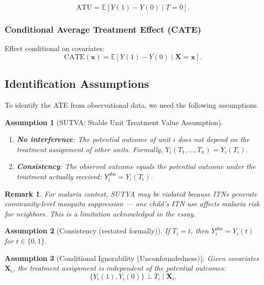 \documentclass[12pt]{article}
\numberwithin{equation}{section}
\newtheorem{assumption}{Assumption}[section]
\newtheorem{remark}{Remark}[section]
\begin{document}
	\[
	\text{ATU} = \mathbb{E}[Y(1) - Y(0) \mid T = 0].
	\]
	
	\subsubsection{Conditional Average Treatment Effect (CATE)}
	
	Effect conditional on covariates:
	\[
	\text{CATE}(\mathbf{x}) = \mathbb{E}[Y(1) - Y(0) \mid \mathbf{X} = \mathbf{x}].
	\]
	
	\subsection{Identification Assumptions}
	
	To identify the ATE from observational data, we need the following assumptions.
	
	\begin{assumption}[SUTVA: Stable Unit Treatment Value Assumption]
		\begin{enumerate}
			\item \textbf{No interference}: The potential outcome of unit $i$ does not depend on the treatment assignment of other units. Formally, $Y_i(T_1, \dots, T_n) = Y_i(T_i)$.
			\item \textbf{Consistency}: The observed outcome equals the potential outcome under the treatment actually received: $Y_i^{\text{obs}} = Y_i(T_i)$.
		\end{enumerate}
	\end{assumption}
	
	\begin{remark}
		For malaria context, SUTVA may be violated because ITNs generate community-level mosquito suppression — one child's ITN use affects malaria risk for neighbors. This is a limitation acknowledged in the essay.
	\end{remark}
	
	\begin{assumption}[Consistency (restated formally)]
		If $T_i = t$, then $Y_i^{\text{obs}} = Y_i(t)$ for $t \in \{0,1\}$.
	\end{assumption}
	
	\begin{assumption}[Conditional Ignorability (Unconfoundedness)]
		Given covariates $\mathbf{X}_i$, the treatment assignment is independent of the potential outcomes:
		\[
		\{Y_i(1), Y_i(0)\} \perp T_i \mid \mathbf{X}_i.
		\]
	\end{assumption}
	
\end{document}
